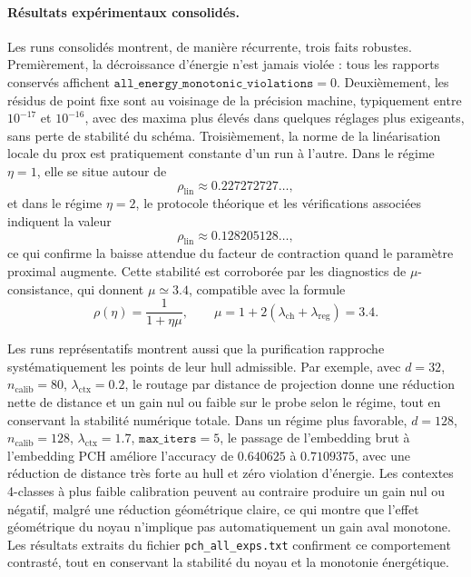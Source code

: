 \paragraph{Résultats expérimentaux consolidés.}
Les runs consolidés montrent, de manière récurrente, trois faits robustes. Premièrement, la décroissance d’énergie n’est jamais violée : tous les rapports conservés affichent \(\texttt{all\_energy\_monotonic\_violations}=0\). Deuxièmement, les résidus de point fixe sont au voisinage de la précision machine, typiquement entre \(10^{-17}\) et \(10^{-16}\), avec des maxima plus élevés dans quelques réglages plus exigeants, sans perte de stabilité du schéma. Troisièmement, la norme de la linéarisation locale du prox est pratiquement constante d’un run à l’autre. Dans le régime \(\eta=1\), elle se situe autour de
\[
\rho_{\mathrm{lin}}\approx 0.227272727\dots,
\]
et dans le régime \(\eta=2\), le protocole théorique et les vérifications associées indiquent la valeur
\[
\rho_{\mathrm{lin}}\approx 0.128205128\dots,
\]
ce qui confirme la baisse attendue du facteur de contraction quand le paramètre proximal augmente. Cette stabilité est corroborée par les diagnostics de \(\mu\)-consistance, qui donnent \(\mu\simeq 3.4\), compatible avec la formule
\[
\rho(\eta)=\frac{1}{1+\eta\mu},
\qquad
\mu=1+2(\lambda_{\mathrm{ch}}+\lambda_{\mathrm{reg}})=3.4.
\]

Les runs représentatifs montrent aussi que la purification rapproche systématiquement les points de leur hull admissible. Par exemple, avec \(d=32\), \(n_{\mathrm{calib}}=80\), \(\lambda_{\mathrm{ctx}}=0.2\), le routage par distance de projection donne une réduction nette de distance et un gain nul ou faible sur le probe selon le régime, tout en conservant la stabilité numérique totale. Dans un régime plus favorable, \(d=128\), \(n_{\mathrm{calib}}=128\), \(\lambda_{\mathrm{ctx}}=1.7\), \(\texttt{max\_iters}=5\), le passage de l’embedding brut à l’embedding PCH améliore l’accuracy de \(0.640625\) à \(0.7109375\), avec une réduction de distance très forte au hull et zéro violation d’énergie. Les contextes 4-classes à plus faible calibration peuvent au contraire produire un gain nul ou négatif, malgré une réduction géométrique claire, ce qui montre que l’effet géométrique du noyau n’implique pas automatiquement un gain aval monotone. Les résultats extraits du fichier \texttt{pch\_all\_exps.txt} confirment ce comportement contrasté, tout en conservant la stabilité du noyau et la monotonie énergétique. 

